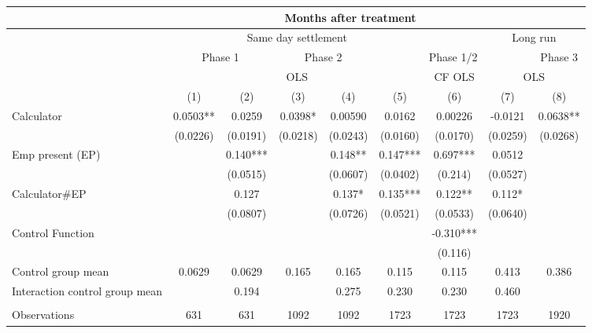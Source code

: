 \begin{tabular}{ccccccccc}
\toprule
\multicolumn{1}{|r}{} & \multicolumn{7}{c}{Months after treatment}            &  \\
\midrule
\multicolumn{1}{r|}{} & \multicolumn{5}{c}{Same day settlement} & \multicolumn{1}{c|}{} & \multicolumn{2}{c}{Long run} \\
\midrule
\midrule
\multicolumn{1}{r|}{} & \multicolumn{2}{c|}{Phase 1} & \multicolumn{2}{c|}{Phase 2} & \multicolumn{3}{c|}{Phase 1/2} & Phase 3 \\
\midrule
\multicolumn{1}{r|}{} & \multicolumn{5}{c|}{OLS}              & \multicolumn{1}{c|}{CF OLS} & \multicolumn{2}{c}{OLS} \\
\midrule
\midrule
\multicolumn{1}{l}{} & (1)   & (2)   & (3)   & (4)   & (5)   & (6)   & (7)   & (8) \\
\multicolumn{1}{l}{Calculator } & 0.0503** & 0.0259 & 0.0398* & 0.00590 & 0.0162 & 0.00226 & -0.0121 & 0.0638** \\
      & (0.0226) & (0.0191) & (0.0218) & (0.0243) & (0.0160) & (0.0170) & (0.0259) & (0.0268) \\
\multicolumn{1}{l}{Emp present (EP)} &       & 0.140*** &       & 0.148** & 0.147*** & 0.697*** & 0.0512 &  \\
      &       & (0.0515) &       & (0.0607) & (0.0402) & (0.214) & (0.0527) &  \\
\multicolumn{1}{l}{Calculator\#EP} &       & 0.127 &       & 0.137* & 0.135*** & 0.122** & 0.112* &  \\
      &       & (0.0807) &       & (0.0726) & (0.0521) & (0.0533) & (0.0640) &  \\
\multicolumn{1}{l}{Control Function} &       &       &       &       &       & -0.310*** &       &  \\
\multicolumn{1}{l}{} &       &       &       &       &       & (0.116) &       &  \\
\midrule
\multicolumn{1}{l}{Control group mean} & 0.0629 & 0.0629 & 0.165 & 0.165 & 0.115 & 0.115 & 0.413 & 0.386 \\
\multicolumn{1}{l}{Interaction control group mean} &       & 0.194 &       & 0.275 & 0.230 & 0.230 & 0.460 &  \\
\midrule
      &       &       &       &       &       &       &       &  \\
\midrule
\multicolumn{1}{l}{Observations} & 631   & 631   & 1092  & 1092  & 1723  & 1723  & 1723  & 1920 \\

\end{tabular}
